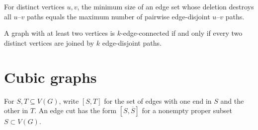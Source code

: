 \begin{notetheorem}
For distinct vertices $u,v$, the minimum size of an edge set whose deletion destroys all $u$--$v$ paths equals the maximum number of pairwise edge-disjoint $u$--$v$ paths.
\end{notetheorem}

\begin{notetheorem}
A graph with at least two vertices is $k$-edge-connected if and only if every two distinct vertices are joined by $k$ edge-disjoint paths.
\end{notetheorem}
\section{Cubic graphs}

\begin{notedefinition}
For $S,T\subseteq V(G)$, write $[S,T]$ for the set of edges with one end in $S$ and the other in $T$.  An edge cut has the form $[S,\overline S]$ for a nonempty proper subset $S\subset V(G)$.
\end{notedefinition}

